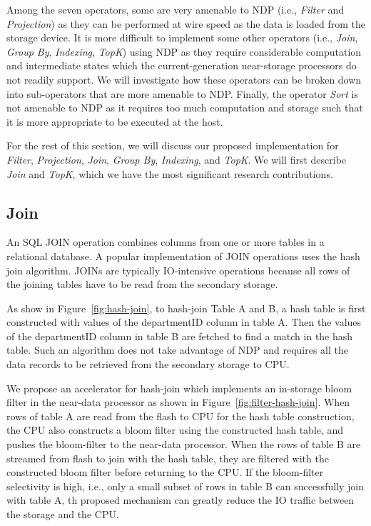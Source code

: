 \documentclass{article}
\newcommand{\filter}{\textit{Filter}\xspace}
\newcommand{\projection}{\textit{Projection}\xspace}
\newcommand{\join}{\textit{Join}\xspace}
\newcommand{\sort}{\textit{Sort}\xspace}
\newcommand{\indexing}{\textit{Indexing}\xspace}
\newcommand{\groupby}{\textit{Group By}\xspace}
\newcommand{\topk}{\textit{TopK}\xspace}
\begin{document}
Among the seven operators, some are very amenable to NDP (i.e., \filter and \projection) as they can be performed at wire speed as the data is loaded from the storage device. It is more difficult to implement some other operators (i.e., \join, \groupby, \indexing, \topk) using NDP as they require considerable computation and intermediate states which the current-generation near-storage processors do not readily support. We will investigate how these operators can be broken down into sub-operators that are more amenable to NDP. 
Finally, the operator \sort is not amenable to NDP as it requires too much computation and storage such that it is more appropriate to be executed at the host. 

For the rest of this section, we will discuss our proposed implementation for \filter, \projection, \join, \groupby, \indexing, and \topk. We will first describe \join and \topk, which we have the most significant research contributions.


\subsection{Join}
\label{sec:join}

An SQL JOIN operation combines columns from one or more tables in a relational database.
A popular implementation of JOIN operations uses the hash join algorithm.
JOINs are typically IO-intensive operations because all rows of the joining tables have to be read from the secondary storage.

As show in Figure~\ref{fig:hash-join}, to hash-join Table A and B, a hash table is first constructed with values of the departmentID column in table A.
Then the values of the departmentID column in table B are fetched to find a match in the hash table.
Such an algorithm does not take advantage of NDP and requires all the data records to be retrieved from the secondary storage to CPU.

We propose an accelerator for hash-join which implements an in-storage bloom filter in the near-data processor as shown in Figure~\ref{fig:filter-hash-join}.
When rows of table A are read from the flash to CPU for the hash table construction, the CPU also constructs a bloom filter using the constructed hash table, and pushes the bloom-filter to the near-data processor.
When the rows of table B are streamed from flash to join with the hash table, they are filtered with the constructed bloom filter before returning to the CPU.
If the bloom-filter selectivity is high, i.e., only a small subset of rows in table B can successfully join with table A, th proposed mechanism can greatly reduce the IO traffic between the storage and the CPU. 
\end{document}
